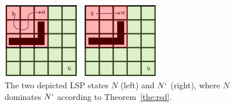 \documentclass[letterpaper]{article} %
\newcommand\Roni[1]{\nb{\textbf{Roni:}}{blue}{#1}}
\begin{document}



\begin{figure}[ht!]
  \centering
  \includegraphics[width=2.7in]{fig/rsd_example.png}
  \caption{The two depicted LSP states $N$ (left) and $N`$ (right), where 
  $N$ dominates $N`$ according to Theorem~\ref{the:rsd}.}
  \label{rsd_example}
\end{figure}
\end{document}
